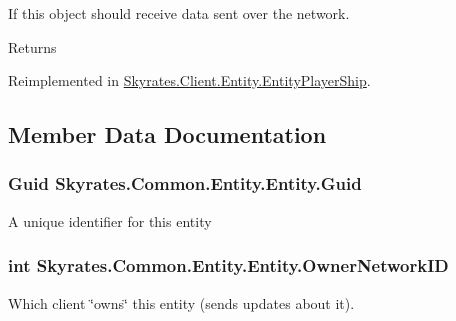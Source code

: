 If this object should receive data sent over the network. 

\begin{DoxyReturn}{Returns}

\end{DoxyReturn}


Reimplemented in \hyperlink{class_skyrates_1_1_client_1_1_entity_1_1_entity_player_ship_acd0bc1462d5fc25e38969f62877d63b6}{Skyrates.\-Client.\-Entity.\-Entity\-Player\-Ship}.



\subsection{Member Data Documentation}
\hypertarget{class_skyrates_1_1_common_1_1_entity_1_1_entity_ae32af79e6a33bed16aeb0455078885c8}{
\subsubsection[{Guid}]{\setlength{\rightskip}{0pt plus 5cm}Guid Skyrates.\-Common.\-Entity.\-Entity.\-Guid}}\label{class_skyrates_1_1_common_1_1_entity_1_1_entity_ae32af79e6a33bed16aeb0455078885c8}


A unique identifier for this entity 

\hypertarget{class_skyrates_1_1_common_1_1_entity_1_1_entity_a855cbcf588c2b4c490c2ddc157e11029}{
\subsubsection[{Owner\-Network\-I\-D}]{\setlength{\rightskip}{0pt plus 5cm}int Skyrates.\-Common.\-Entity.\-Entity.\-Owner\-Network\-I\-D}}\label{class_skyrates_1_1_common_1_1_entity_1_1_entity_a855cbcf588c2b4c490c2ddc157e11029}


Which client \char`\"{}owns\char`\"{} this entity (sends updates about it). 



